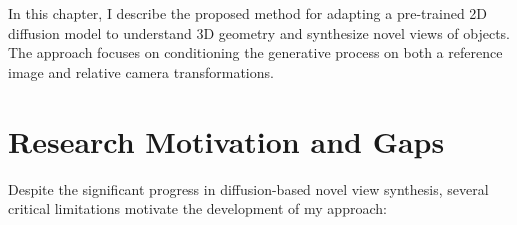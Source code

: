 \label{chapter:proposed-method}

In this chapter, I describe the proposed method for adapting a pre-trained 2D diffusion model to understand 3D geometry and synthesize novel views of objects. The approach focuses on conditioning the generative process on both a reference image and relative camera transformations.

\section{Research Motivation and Gaps}\label{sec:limitations}

Despite the significant progress in diffusion-based novel view synthesis, several critical limitations motivate the development of my approach:

